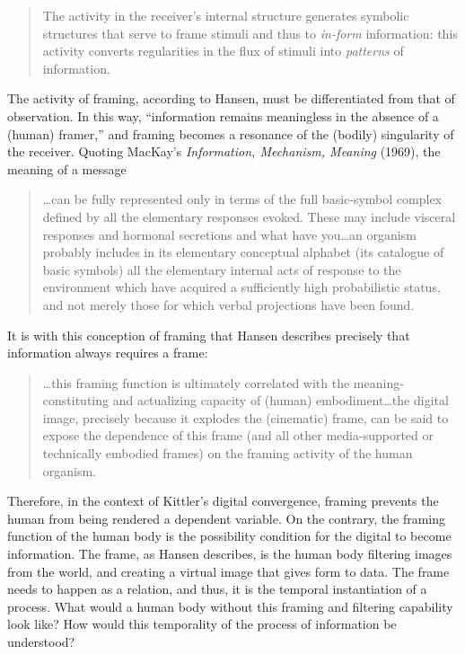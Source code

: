 \begin{quote}
	The activity in the receiver's internal structure generates symbolic structures that serve to frame stimuli and thus to \textit{in-form} information: this activity converts regularities in the flux of stimuli into \textit{patterns} of information. \parencite[76]{Han02:Cin}
\end{quote}

The activity of framing, according to Hansen, must be differentiated from that of observation. In this way, ``information remains meaningless in the absence of a (human) framer,'' \parencite[77]{Han02:Cin} and framing becomes a resonance of the (bodily) singularity of the receiver. Quoting MacKay's \textit{Information, Mechanism, Meaning} (1969), the meaning of a message

\begin{quote}
	\dots can be fully represented only in terms of the full basic-symbol complex defined by all the elementary responses evoked. These may include visceral responses and hormonal secretions and what have you\dots an organism probably includes in its elementary conceptual alphabet (its catalogue of basic symbols) all the elementary internal acts of response to the environment which have acquired a sufficiently high probabilistic status, and not merely those for which verbal projections have been found. \parencite[78]{Han02:Cin}
\end{quote}

It is with this conception of framing that Hansen describes precisely that information always requires a frame:

\begin{quote}
	\dots this framing function is ultimately correlated with the meaning-constituting and actualizing capacity of (human) embodiment\dots the digital image, precisely because it explodes the (cinematic) frame, can be said to expose the dependence of this frame (and all other media-supported or technically embodied frames) on the framing activity of the human organism. \parencite[89-90]{Han02:Cin}
\end{quote}

Therefore, in the context of Kittler's digital convergence, framing prevents the human from being rendered a dependent variable. On the contrary, the framing function of the human body is the possibility condition for the digital to become information. The frame, as Hansen describes, is the human body filtering images from the world, and creating a virtual image that gives form to data. The frame needs to happen as a relation, and thus, it is the temporal instantiation of a process. What would a human body without this framing and filtering capability look like? How would this temporality of the process of information be understood? 

